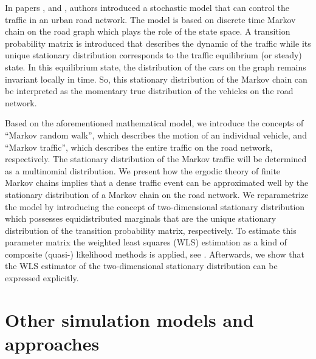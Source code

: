 \documentclass[b5paper,12pt]{report}
\theoremstyle{definition}
\begin{document}
In papers \cite{Crisostomietal2011}, \cite{Faizraetal2015} and \cite{Faizrahnemoon2016}, authors introduced a stochastic model that can control the traffic in an urban road network. The model is based on discrete time Markov chain on the road graph which plays the role of the state space. A transition probability matrix is introduced that describes the dynamic of the traffic while its unique stationary distribution corresponds to the traffic equilibrium (or steady) state. In this equilibrium state, the distribution of the cars on the graph remains invariant locally in time. So, this stationary distribution of the Markov chain can be interpreted as the momentary true distribution of the vehicles on the road network.

Based on the aforementioned mathematical model, we introduce the concepts of \enquote{Markov random walk}, which describes the motion of an individual vehicle, and \enquote{Markov traffic}, which describes the entire traffic on the road network, respectively. The stationary distribution of the Markov traffic will be determined as a multinomial distribution. We present how the ergodic theory of finite Markov chains implies that a dense traffic event can be approximated well by the stationary distribution of a Markov chain on the road network. We reparametrize the model by introducing the concept of two-dimensional stationary distribution which possesses equidistributed marginals that are the unique stationary distribution of the transition probability matrix, respectively. To estimate this parameter matrix the weighted least squares (WLS) estimation as a kind of composite (quasi-) likelihood methods is applied, see \cite{Hjort2008Varin}. Afterwards, we show that the WLS estimator of the two-dimensional stationary distribution can be expressed explicitly.

\section{Other simulation models and approaches}
\end{document}
